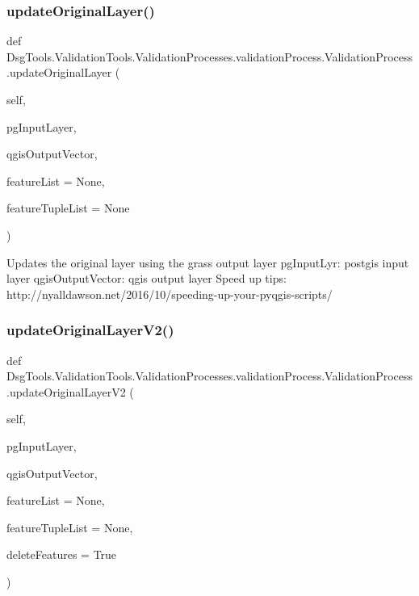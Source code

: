 \subsubsection{\texorpdfstring{update\+Original\+Layer()}{updateOriginalLayer()}}
{\footnotesize\ttfamily def Dsg\+Tools.\+Validation\+Tools.\+Validation\+Processes.\+validation\+Process.\+Validation\+Process.\+update\+Original\+Layer (\begin{DoxyParamCaption}\item[{}]{self,  }\item[{}]{pg\+Input\+Layer,  }\item[{}]{qgis\+Output\+Vector,  }\item[{}]{feature\+List = {\ttfamily None},  }\item[{}]{feature\+Tuple\+List = {\ttfamily None} }\end{DoxyParamCaption})}

\begin{DoxyVerb}Updates the original layer using the grass output layer
pgInputLyr: postgis input layer
qgisOutputVector: qgis output layer
Speed up tips: http://nyalldawson.net/2016/10/speeding-up-your-pyqgis-scripts/
\end{DoxyVerb}
 \mbox{\label{class_dsg_tools_1_1_validation_tools_1_1_validation_processes_1_1validation_process_1_1_validation_process_a7b4cd068aedb219df5f71ab7ed6cb3b5}} 
\subsubsection{\texorpdfstring{update\+Original\+Layer\+V2()}{updateOriginalLayerV2()}}
{\footnotesize\ttfamily def Dsg\+Tools.\+Validation\+Tools.\+Validation\+Processes.\+validation\+Process.\+Validation\+Process.\+update\+Original\+Layer\+V2 (\begin{DoxyParamCaption}\item[{}]{self,  }\item[{}]{pg\+Input\+Layer,  }\item[{}]{qgis\+Output\+Vector,  }\item[{}]{feature\+List = {\ttfamily None},  }\item[{}]{feature\+Tuple\+List = {\ttfamily None},  }\item[{}]{delete\+Features = {\ttfamily True} }\end{DoxyParamCaption})}

